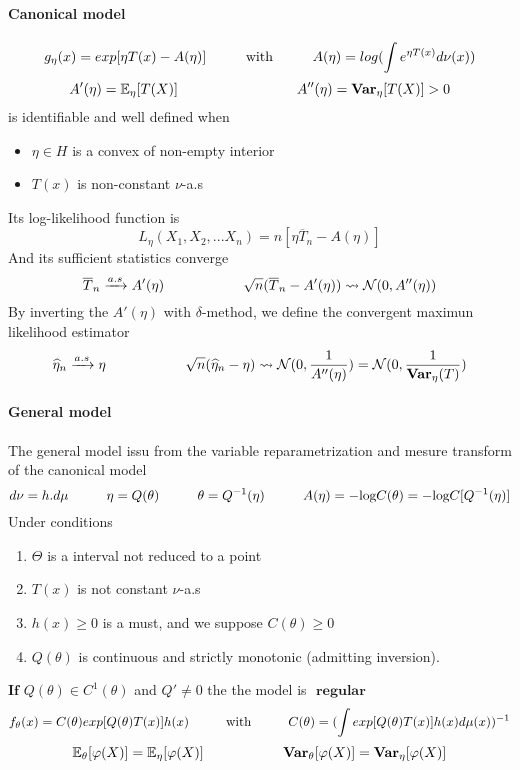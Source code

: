 \documentclass[a4paper,10pt]{article}
\begin{document}
\paragraph{Canonical model}
\[
g_{\eta}(x) = exp [\eta T(x) - A(\eta)]
\hspace{10mm} \text{with} \hspace{10mm}
 A(\eta) = log (\int e^{ \eta T(x)}  d\nu(x) ) 
\]
\[
 A'(\eta) = \mathbb{E}_{\eta}[T(X)]  
\hspace{30mm} 
 A''(\eta)= \textbf{Var}_{\eta}[T(X)]  > 0
\]
is identifiable and well defined when 
\begin{itemize}
 \item ${\eta \in H}$ is a convex of non-empty interior
 \item $T(x)$ is non-constant $\nu$-a.s
\end{itemize}
Its log-likelihood function is 
\[
L_{\eta}(X_1,X_2,...X_n) = n[\eta \overline{T}_n -A(\eta)]
\]
And its sufficient statistics converge
\[
\overline{T}_n \xrightarrow{a.s} A'(\eta) 
\hspace{20mm}
\sqrt{n}(\overline{T}_n - A'(\eta) ) \rightsquigarrow   \mathcal{N}(0,A''(\eta))
\]
By inverting the $A'(\eta)$ with $\delta$-method, we define the convergent maximun likelihood estimator 
\[
\widehat{\eta}_n \xrightarrow{a.s} \eta 
\hspace{20mm}
\sqrt{n}(\widehat{\eta}_n - \eta ) \rightsquigarrow   \mathcal{N}(0,\frac{1}{A''(\eta)} ) = \mathcal{N}(0,\frac{1}{\textbf{Var}_{\eta}(T)} )
\]

\paragraph{General model}
The general model issu from the variable reparametrization and mesure transform of the canonical model
\[
d\nu = h.d\mu  \hspace{10mm} \eta = Q(\theta) \hspace{10mm}  \theta = Q^{-1}(\eta) \hspace{10mm} 
A(\eta) = -\text{log}C(\theta) =  -\text{log}C[Q^{-1}(\eta)] 
\]
Under conditions 
\begin{enumerate}
 \item $\Theta$ is a interval not reduced to a point
 \item $T(x)$ is not constant $\nu$-a.s
 \item $h(x) \geq 0$ is a must, and we suppose $C(\theta) \geq 0$
 \item $Q(\theta)$ is continuous and strictly monotonic (admitting inversion). 
\end{enumerate}
$\textbf{If } Q(\theta) \in C^{1}(\theta)$ and $Q'\neq 0$ the the model is $\textbf{ regular}$
\[
f_{\theta}(x) = C(\theta) exp[Q(\theta) T(x)] h(x)
\hspace{10mm} \text{with} \hspace{10mm}
C(\theta) = (\int exp[Q(\theta) T(x)] h(x) d\mu(x) ) ^{-1}
\]
\[
\mathbb{E}_{\theta}[\varphi(X)]  = \mathbb{E}_{\eta}[\varphi(X)]
 \hspace{20mm}
\textbf{Var}_{\theta}[\varphi(X)]  = \textbf{Var}_{\eta}[\varphi(X)]
\]
\end{document}
